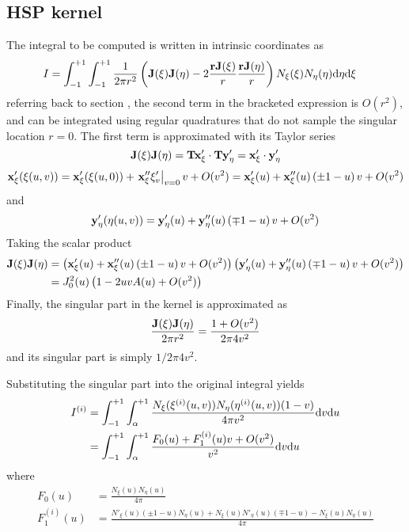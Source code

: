 \subsection{HSP kernel}

The integral to be computed is written in intrinsic coordinates as
%
\begin{align}
	I 
	&= \int_{-1}^{+1}
	\int_{-1}^{+1}
	\frac{1}{2\pi r^2} \left(
	{\bf J}(\xi) {\bf J}(\eta) - 2 \frac{{\bf r} {\bf J}(\xi)}{r} \frac{{\bf r}{\bf J}(\eta)}{r} 
	\right)	N_{\xi}(\xi)
	N_{\eta}(\eta)
	\mathrm{d} \eta
	\mathrm{d} \xi
\end{align}
%
referring back to section \label{sec:}, the second term in the bracketed expression is $O(r^2)$, and can be integrated using regular quadratures that do not sample the singular location $r=0$.
The first term is approximated with its Taylor series
%
\begin{equation}
	{\bf J}(\xi) {\bf J}(\eta) 
	= {\bf T} {\bf x}'_{\xi} \cdot {\bf T} {\bf y}'_{\eta}
	= {\bf x}'_{\xi} \cdot {\bf y}'_{\eta}
\end{equation}
%
\begin{equation}
	{\bf x}'_{\xi}(\xi(u,v)) 
	= {\bf x}'_{\xi}(\xi(u,0)) + \left.{\bf x}''_{\xi} \xi'_v \right|_{v=0} v + O(v^2) 
	= {\bf x}'_{\xi}(u) + {\bf x}''_{\xi}(u) \left(\pm 1 - u\right) v + O(v^2) 
\end{equation}
%
and
%
\begin{equation}
	{\bf y}'_{\eta}(\eta(u,v)) 
	= {\bf y}'_{\eta}(u) + {\bf y}''_{\eta}(u) \left(\mp 1 - u\right) v + O(v^2) 
\end{equation}
%
Taking the scalar product
%
\begin{align}
	{\bf J}(\xi) {\bf J}(\eta) 
	&= \left(
	{\bf x}'_{\xi}(u) + {\bf x}''_{\xi}(u) \left(\pm 1 - u\right) v + O(v^2) 
	\right)
	\left(
	{\bf y}'_{\eta}(u) + {\bf y}''_{\eta}(u) \left(\mp 1 - u\right) v + O(v^2) 	
	\right) \\
	&= J_0^2(u) \left(1 -2uvA(u) + O(v^2) \right)
\end{align}
%
Finally, the singular part in the kernel is approximated as
%
\begin{equation}
	\frac{{\bf J}(\xi) {\bf J}(\eta)}{2\pi r^2}
	= \frac{1 + O(v^2)}{2\pi 4v^2}
\end{equation}
%
and its singular part is simply $1/2\pi 4 v^2$.

Substituting the singular part into the original integral yields
%
\begin{align}
	I^{(i)}
	&= \int_{-1}^{+1}
	\int_{\alpha}^{+1}
	\frac{	N_{\xi}(\xi^{(i)}(u,v))
	N_{\eta}(\eta^{(i)}(u,v))
	(1-v)
	}{4\pi v^2}
	\mathrm{d} v
	\mathrm{d} u \\
	&= \int_{-1}^{+1}
	\int_{\alpha}^{+1}
	\frac{F_0(u) + F_1^{(i)}(u) v + O(v^2)}{v^2}
	\mathrm{d} v
	\mathrm{d} u
\end{align}
%
where
%
\begin{align}
	F_0(u) &= \frac{N_{\xi}(u) N_{\eta}(u)}{4\pi} \\
	F_1^{(i)}(u) &= \frac{N'_{\xi}(u) (\pm 1-u) N_{\eta}(u) + N_{\xi}(u) N'_{\eta}(u) (\mp 1-u) - N_{\xi}(u) N_{\eta}(u)}{4\pi}
\end{align}


